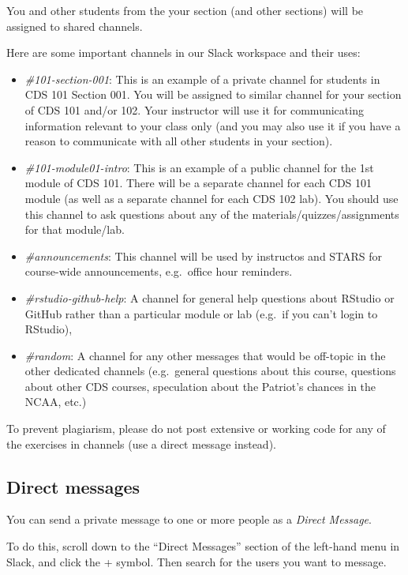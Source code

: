 \documentclass[
]{book}
\begin{document}
You and other students from the your section (and other sections) will be assigned to shared channels.

Here are some important channels in our Slack workspace and their uses:

\begin{itemize}
\item
  \emph{\#101-section-001}: This is an example of a private channel for students in CDS 101 Section 001. You will be assigned to similar channel for your section of CDS 101 and/or 102. Your instructor will use it for communicating information relevant to your class only (and you may also use it if you have a reason to communicate with all other students in your section).
\item
  \emph{\#101-module01-intro}: This is an example of a public channel for the 1st module of CDS 101. There will be a separate channel for each CDS 101 module (as well as a separate channel for each CDS 102 lab). You should use this channel to ask questions about any of the materials/quizzes/assignments for that module/lab.
\item
  \emph{\#announcements}: This channel will be used by instructos and STARS for course-wide announcements, e.g.~office hour reminders.
\item
  \emph{\#rstudio-github-help}: A channel for general help questions about RStudio or GitHub rather than a particular module or lab (e.g.~if you can't login to RStudio),
\item
  \emph{\#random}: A channel for any other messages that would be off-topic in the other dedicated channels (e.g.~general questions about this course, questions about other CDS courses, speculation about the Patriot's chances in the NCAA, etc.)
\end{itemize}

To prevent plagiarism, please do not post extensive or working code for any of the exercises in channels (use a direct message instead).

\hypertarget{direct-messages}{%
\subsection{Direct messages}\label{direct-messages}}

You can send a private message to one or more people as a \emph{Direct Message}.

To do this, scroll down to the ``Direct Messages'' section of the left-hand menu in Slack, and click the + symbol. Then search for the users you want to message.
\end{document}
